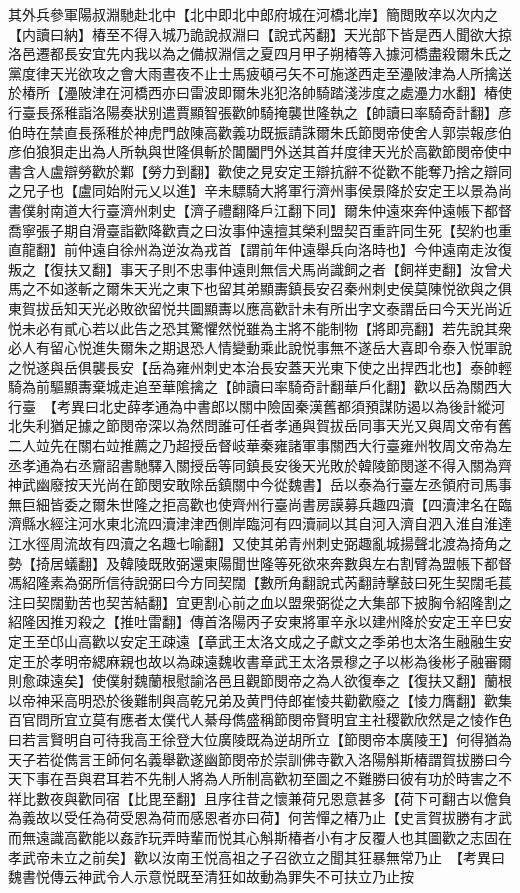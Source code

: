 其外兵參軍陽叔淵馳赴北中【北中即北中郎府城在河橋北岸】簡閲敗卒以次内之【内讀曰納】椿至不得入城乃詭說叔淵曰【說式芮翻】天光部下皆是西人聞欲大掠洛邑遷都長安宜先内我以為之備叔淵信之夏四月甲子朔椿等入據河橋盡殺爾朱氏之黨度律天光欲攻之會大雨晝夜不止士馬疲頓弓矢不可施遂西走至灅陂津為人所擒送於椿所【灅陂津在河橋西亦曰雷波即爾朱兆犯洛帥騎踏淺涉度之處灅力水翻】椿使行臺長孫稚詣洛陽奏狀别遣賈顯智張歡帥騎掩襲世隆執之【帥讀曰率騎奇計翻】彦伯時在禁直長孫稚於神虎門啟陳高歡義功既振請誅爾朱氏節閔帝使舍人郭崇報彦伯彦伯狼狽走出為人所執與世隆俱斬於閶闔門外送其首幷度律天光於高歡節閔帝使中書含人盧辯勞歡於鄴【勞力到翻】歡使之見安定王辯抗辭不從歡不能奪乃捨之辯同之兄子也【盧同始附元乂以進】辛未驃騎大將軍行濟州事侯景降於安定王以景為尚書僕射南道大行臺濟州刺史【濟子禮翻降戶江翻下同】爾朱仲遠來奔仲遠帳下都督喬寧張子期自滑臺詣歡降歡責之曰汝事仲遠擅其榮利盟契百重許同生死【契約也重直龍翻】前仲遠自徐州為逆汝為戎首【謂前年仲遠舉兵向洛時也】今仲遠南走汝復叛之【復扶又翻】事天子則不忠事仲遠則無信犬馬尚識飼之者【飼祥吏翻】汝曾犬馬之不如遂斬之爾朱天光之東下也留其弟顯夀鎮長安召秦州刺史侯莫陳悦欲與之俱東賀拔岳知天光必敗欲留悦共圖顯夀以應高歡計未有所出字文泰謂岳曰今天光尚近悦未必有貳心若以此告之恐其驚懼然悦雖為主將不能制物【將即亮翻】若先說其衆必人有留心悦進失爾朱之期退恐人情變動乘此說悦事無不遂岳大喜即令泰入悦軍說之悦遂與岳俱襲長安【岳為雍州刺史本治長安蓋天光東下使之出捍西北也】泰帥輕騎為前驅顯夀棄城走追至華隂擒之【帥讀曰率騎奇計翻華戶化翻】歡以岳為關西大行臺　【考異曰北史薛孝通為中書郎以關中險固秦漢舊都須預謀防遏以為後計縱河北失利猶足據之節閔帝深以為然問誰可任者孝通與賀拔岳同事天光又與周文帝有舊二人竝先在關右竝推薦之乃超授岳督岐華秦雍諸軍事關西大行臺雍州牧周文帝為左丞孝通為右丞齎詔書馳驛入關授岳等同鎮長安後天光敗於韓陵節閔遂不得入關為齊神武幽廢按天光尚在節閔安敢除岳鎮關中今從魏書】岳以泰為行臺左丞領府司馬事無巨細皆委之爾朱世隆之拒高歡也使齊州行臺尚書房謨募兵趣四瀆【四瀆津名在臨濟縣水經注河水東北流四瀆津津西側岸臨河有四瀆祠以其自河入濟自泗入淮自淮達江水徑周流故有四瀆之名趣七喻翻】又使其弟青州刺史弼趣亂城揚聲北渡為掎角之勢【掎居蟻翻】及韓陵既敗弼還東陽聞世隆等死欲來奔數與左右割臂為盟帳下都督馮紹隆素為弼所信待說弼曰今方同契闊【數所角翻說式芮翻詩擊鼓曰死生契闊毛萇注曰契闊勤苦也契苦結翻】宜更割心前之血以盟衆弼從之大集部下披胸令紹隆割之紹隆因推刃殺之【推吐雷翻】傳首洛陽丙子安東將軍辛永以建州降於安定王辛巳安定王至邙山高歡以安定王疎遠【章武王太洛文成之子獻文之季弟也太洛生融融生安定王於孝明帝緦麻親也故以為疎遠魏收書章武王太洛景穆之子以彬為後彬子融審爾則愈疎遠矣】使僕射魏蘭根慰諭洛邑且觀節閔帝之為人欲復奉之【復扶又翻】蘭根以帝神采高明恐於後難制與高乾兄弟及黄門侍郎崔㥄共勸歡廢之【㥄力膺翻】歡集百官問所宜立莫有應者太僕代人綦母儁盛稱節閔帝賢明宜主社稷歡欣然是之㥄作色曰若言賢明自可待我高王徐登大位廣陵既為逆胡所立【節閔帝本廣陵王】何得猶為天子若從儁言王師何名義舉歡遂幽節閔帝於崇訓佛寺歡入洛陽斛斯椿謂賀拔勝曰今天下事在吾與君耳若不先制人將為人所制高歡初至圖之不難勝曰彼有功於時害之不祥比數夜與歡同宿【比毘至翻】且序往昔之懷兼荷兄恩意甚多【荷下可翻古以儋負為義故以受任為荷受恩為荷而感恩者亦曰荷】何苦憚之椿乃止【史言賀拔勝有才武而無遠識高歡能以姦詐玩弄時輩而悦其心斛斯椿者小有才反覆人也其圖歡之志固在孝武帝未立之前矣】歡以汝南王悦高祖之子召欲立之聞其狂暴無常乃止　【考異曰魏書悦傳云神武令人示意悦既至清狂如故動為罪失不可扶立乃止按
